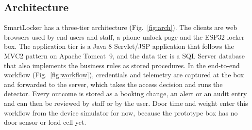 \documentclass[journal,onecolumn]{IEEEtran}
\begin{document}
\subsection{Architecture}

SmartLocker has a three-tier architecture (Fig.~\ref{fig:arch}). The clients are web browsers used by end users and
staff, a phone unlock page and the ESP32 locker box. The application tier is a Java 8 Servlet/JSP application that
follows the MVC2 pattern on Apache Tomcat~9, and the data tier is a SQL Server database that also implements the
business rules as stored procedures. In the end-to-end workflow (Fig.~\ref{fig:workflow}), credentials and telemetry
are captured at the box and forwarded to the server, which takes the access decision and runs the detector. Every
outcome is stored as a booking change, an alert or an audit entry and can then be reviewed by staff or by the user.
Door time and weight enter this workflow from the device simulator for now, because the prototype box has no door
sensor or load cell yet.
\end{document}
